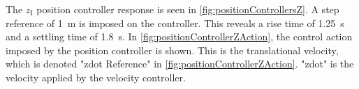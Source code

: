 \begin{minipage}{\linewidth}
\begin{minipage}{0.45\linewidth}
\begin{figure}[H]
            \centering
            \label{fig:velocityControllerZAction}
        \end{figure}
    \end{minipage}
\end{minipage}

The $z_{\mathrm{I}}$ position controller response is seen in \autoref{fig:positionControllersZ}. A step reference of \SI{1}{m} is imposed on the controller. This reveals a rise time of \SI{1.25}{s} and a settling time of \SI{1.8}{s}. In \autoref{fig:positionControllerZAction}, the control action imposed by the position controller is shown. This is the translational velocity, which is denoted "zdot Reference" in \autoref{fig:positionControllerZAction}. "zdot" is the velocity applied by the velocity controller.
